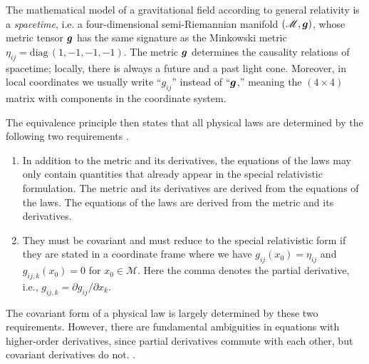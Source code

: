 %

\begin{definition}
The mathematical model of a gravitational field according to general
relativity is a \emph{spacetime}, i.e. a
four-dimensional semi-Riemannian manifold 
$(\mathscr{M}, \mbox{$\boldsymbol{g}$})$, whose metric tensor $\mbox{$\boldsymbol{g}$}$ has the 
same signature 
as the Minkowski metric 
$\eta_{ij} = \mathrm{diag}\,(1,-1,-1,-1)$.
The metric $\mbox{$\boldsymbol{g}$}$ determines the causality relations of spacetime;
locally, there is always a future and a past light cone.
Moreover, in local coordinates we usually write “$g_{ij}$” instead of “$\mbox{$\boldsymbol{g}$}$,” meaning the $(4 \times 4)$ matrix with components in the coordinate system.
\end{definition}

The equivalence principle then states 
that all physical laws are determined by the
following two requirements \cite[§2.I.3]{Straumann-1988}.
\begin{enumerate}
	\item
	In addition to the metric and its derivatives, the equations of the laws may only contain quantities that already appear in the special relativistic formulation. The metric and its derivatives are derived from the equations of the laws. The equations of the laws are derived from the metric and its derivatives.
	
	\item
	They must be covariant and must reduce to the special relativistic form if they are stated in a coordinate frame where we have $g_{ij}(x_0) = \eta_{ij}$ and 
	$g_{ij,k}(x_0) = 0$ for $x_0 \in \mathscr{M}$. %
	{%
		Here the comma denotes the partial derivative, i.e.,
		$g_{ij,k} = \partial g_{ij}/\partial x_k$. 
	}
\end{enumerate}
The covariant form of a physical law is largely determined by these two
requirements. However, there are fundamental
ambiguities in equations with higher-order derivatives,
since partial derivatives commute with each other, but covariant derivatives do not. \cite[§2.I.4.4]{Straumann-1988}.


